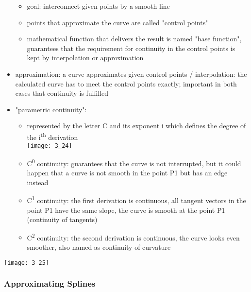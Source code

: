 \documentclass{standalone}
\begin{document}
\begin{itemize}
\begin{itemize}
		\item goal: interconnect given points by a smooth line
		\item points that approximate the curve are called "control points"
		\item mathematical function that delivers the result is named "base function", guarantees that the requirement for continuity in the control points is kept by interpolation or approximation
	\end{itemize}
	\item approximation: a curve approximates given control points / interpolation: the calculated curve has to meet the control points exactly; important in both cases that continuity is fulfilled
	\item "parametric continuity":
	\begin{itemize}
		\item represented by the letter C and its exponent i which defines the degree of the i\textsuperscript{th} derivation \\
		\texttt{[image: 3\_24]}
		\item C\textsuperscript{0} continuity: guarantees that the curve is not interrupted, but it could happen that a curve is not smooth in the point P1 but has an edge instead
		\item C\textsuperscript{1} continuity: the first derivation is continuous, all tangent vectors in the point P1 have the same slope, the curve is smooth at the point P1 (continuity of tangents)
		\item C\textsuperscript{2} continuity: the second derivation is continuous, the curve looks even smoother, also named as continuity of curvature
	\end{itemize}
\end{itemize}

\texttt{[image: 3\_25]}

\subsubsection*{Approximating Splines}
\end{document}
